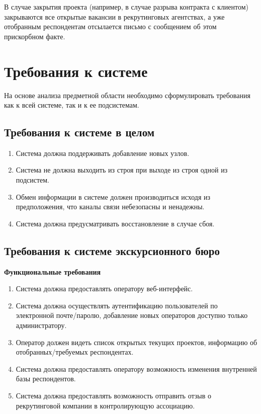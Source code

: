 В случае закрытия проекта (например, в случае разрыва контракта с клиентом) закрываются все открытые вакансии в рекрутинговых агентствах, а уже отобранным респондентам отсылается письмо с сообщением об этом прискорбном факте.

\section{Требования к системе}
На основе анализа предметной области необходимо сформулировать требования как к всей системе, так и к ее подсистемам.

\subsection{Требования к системе в целом}
\begin{enumerate}
\item Система должна поддерживать добавление новых узлов.
\item Система не должна выходить из строя при выходе из строя одной из подсистем.
\item Обмен информации в системе должен производиться исходя из предположения, что каналы связи небезопасны и ненадежны.
\item Система должна предусматривать восстановление в случае сбоя.
\end{enumerate}

\subsection{Требования к системе экскурсионного бюро}

\textbf{Функциональные требования}
\begin{enumerate}
\item Система должна предоставлять оператору веб-интерфейс.
\item Система должна осуществлять  аутентификацию пользователей по электронной почте/паролю, добавление новых операторов доступно только администратору.
\item Оператор должен видеть список открытых текущих проектов, информацию об отобранных/требуемых респондентах.
\item Система должна предоставлять оператору возможность изменения внутренней базы респондентов.
\item Система должна предоставлять возможность отправить отзыв о рекрутинговой компании в контролирующую ассоциацию.
\end{enumerate}

